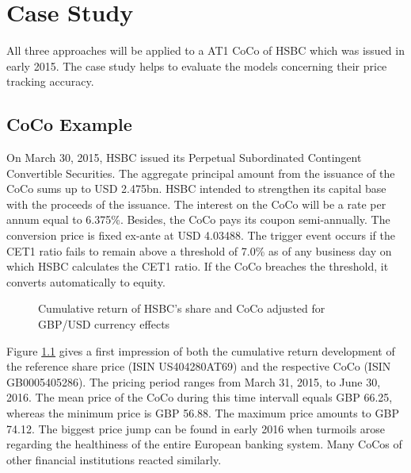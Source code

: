 \chapter{Case Study}\label{empiricalanalysis}
All three approaches will be applied to a AT1 CoCo of HSBC which was issued in early 2015. The case study helps to evaluate the models concerning their price tracking accuracy. 

\section{CoCo Example}
On March 30, 2015, HSBC issued its Perpetual Subordinated Contingent Convertible Securities. The aggregate principal amount from the issuance of the CoCo sums up to USD 2.475bn. HSBC intended to strengthen its capital base with the proceeds of the issuance. The interest on the CoCo will be a rate per annum equal to 6.375\%. Besides, the CoCo pays its coupon semi-annually. The conversion price is fixed ex-ante at USD 4.03488. The trigger event occurs if the CET1 ratio fails to remain above a threshold of 7.0\% as of any business day on which HSBC calculates the CET1 ratio. If the CoCo breaches the threshold, it converts automatically to equity.

\begin{figure}[H]
\centering
{}
\caption[Cumulative return of HSBC's CoCo and equity]{Cumulative return of HSBC's share and CoCo adjusted for GBP/USD currency effects}
\label{fig:cumulative}
\end{figure}

Figure \ref{fig:cumulative} gives a first impression of both the cumulative return development of the reference share price (ISIN US404280AT69) and the respective CoCo (ISIN GB0005405286). The pricing period ranges from March 31, 2015, to June 30, 2016. The mean price of the CoCo during this time intervall equals GBP 66.25, whereas the minimum price is GBP 56.88. The maximum price amounts to GBP 74.12. The biggest price jump can be found in early 2016 when turmoils arose regarding the healthiness of the entire European banking system. Many CoCos of other financial institutions reacted similarly.

